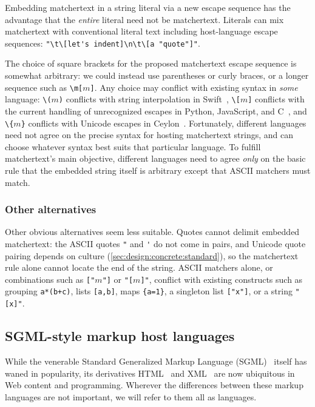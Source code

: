 Embedding matchertext in a string literal via a new escape sequence
has the advantage that the \emph{entire} literal need not be matchertext.
Literals can mix matchertext with conventional literal text
including host-language escape sequences:
\eg \verb|"\t\[let's indent]\n\t\[a "quote"]"|.

The choice of square brackets for the proposed matchertext escape sequence
is somewhat arbitrary:
we could instead use parentheses or curly braces,
or a longer sequence such as \verb|\m[|$m$\verb|]|.
Any choice may conflict with existing syntax in \emph{some} language:
\eg
\verb|\(|$m$\verb|)| conflicts with
string interpolation in Swift~\cite{apple22swift},
\verb|\[|$m$\verb|]| conflicts with the current handling of
unrecognized escapes in Python, JavaScript, and C~\cite{python26reference,ecma26ecmascript},
and
\verb|\{|$m$\verb|}| conflicts with
Unicode escapes in Ceylon~\cite{king17ceylon}.
Fortunately, different languages need not agree on
the precise syntax for hosting matchertext strings,
and can choose whatever syntax best suits that particular language.
To fulfill matchertext's main objective,
different languages need to agree \emph{only} on the basic rule
that the embedded string itself is arbitrary except that
ASCII matchers must match.

\subsubsection{Other alternatives}
\label{sec:host:c:other}

Other obvious alternatives seem less suitable.
Quotes cannot delimit embedded matchertext:
the ASCII quotes \verb|"| and \verb|'| do not come in pairs,
and Unicode quote pairing depends on culture
(\cref{sec:design:concrete:standard}),
so the matchertext rule alone cannot locate the end of the string.
ASCII matchers alone,
or combinations such as \verb|["|$m$\verb|"]| or \verb|"[|$m$\verb|]"|,
conflict with existing constructs
such as grouping \verb|a*(b+c)|, lists \verb|[a,b]|, maps \verb|{a=1}|,
a singleton list \verb|["x"]|, or a string \verb|"[x]"|.


\subsection{SGML-style markup host languages}
\label{sec:host:ml}

While the venerable
Standard Generalized Markup Language (SGML)~\cite{iso8879sgml,goossens95sgml}
itself has waned in popularity,
its derivatives HTML~\cite{whatwg22html} and XML~\cite{w3c08xml}
are now ubiquitous in Web content and programming.
Wherever the differences between these markup languages are not important,
we will refer to them all as \ml languages.

